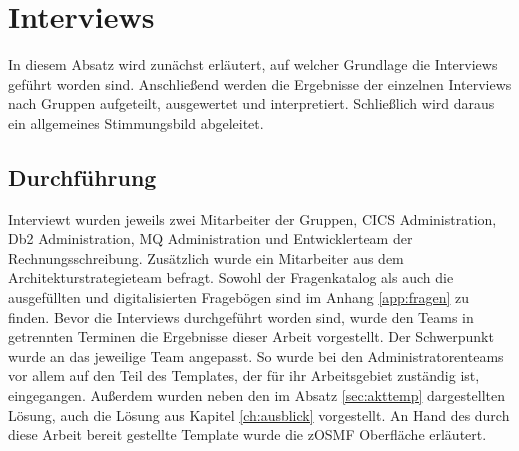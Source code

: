 \section{Interviews}
In diesem Absatz wird zunächst erläutert, auf welcher Grundlage die Interviews geführt worden sind.
Anschließend werden die Ergebnisse der einzelnen Interviews nach Gruppen aufgeteilt, ausgewertet und interpretiert.
Schließlich wird daraus ein allgemeines Stimmungsbild abgeleitet.

\subsection{Durchführung}
Interviewt wurden jeweils zwei Mitarbeiter der Gruppen, CICS Administration, Db2 Administration, MQ Administration und Entwicklerteam der Rechnungsschreibung.
Zusätzlich wurde ein Mitarbeiter aus dem Architekturstrategieteam befragt.
Sowohl der Fragenkatalog als auch die ausgefüllten und digitalisierten Fragebögen sind im Anhang \ref{app:fragen} zu finden.
Bevor die Interviews durchgeführt worden sind, wurde den Teams in getrennten Terminen die Ergebnisse dieser Arbeit vorgestellt.
Der Schwerpunkt wurde an das jeweilige Team angepasst.
So wurde bei den Administratorenteams vor allem auf den Teil des Templates, der für ihr Arbeitsgebiet zuständig ist, eingegangen.
Außerdem wurden neben den im Absatz \ref{sec:akttemp} dargestellten Lösung, auch die Lösung aus Kapitel \ref{ch:ausblick} vorgestellt.
An Hand des durch diese Arbeit bereit gestellte Template wurde die zOSMF Oberfläche erläutert.

